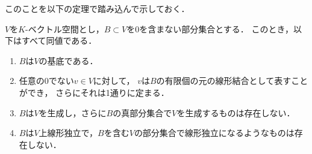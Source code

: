 このことを以下の定理で踏み込んで示しておく．
\begin{thm}\label{thm:basis_properties}
    $V$を$K$-ベクトル空間とし，$B \subset V$を$0$を含まない部分集合とする．
    このとき，以下はすべて同値である．
    \begin{enumerate}
        \item $B$は$V$の基底である．
        \item 任意の0でない$v \in V$に対して，
        $v$は$B$の有限個の元の線形結合として表すことができ，
        さらにそれは1通りに定まる．
        \item $B$は$V$を生成し，さらに$B$の真部分集合で$V$を生成するものは存在しない．
        \item $B$は$V$上線形独立で，$B$を含む$V$の部分集合で線形独立になるようなものは存在しない．
    \end{enumerate}
\end{thm}
